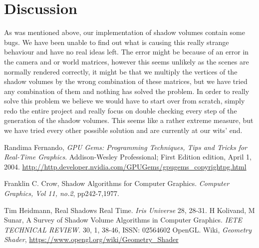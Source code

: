 \documentclass[a4paper, 12pt]{article}
\begin{document}
\section{Discussion}
As was mentioned above, our implementation of shadow volumes contain some bugs. We have been unable to find out what is causing this really strange behaviour and have no real ideas left. The error might be because of an error in the camera and or world matrices, however this seems unlikely as the scenes are normally rendered correctly, it might be that we multiply the vertices of the shadow volumes by the wrong combination of these matrices, but we have tried any combination of them and nothing has solved the problem. In order to really solve this problem we believe we would have to start over from scratch, simply redo the entire project and really focus on double checking every step of the generation of the shadow volumes. This seems like a rather extreme measure, but
we have tried every other possible solution and are currently at our wits' end.

\begin{thebibliography}{9}
	Randima Fernando,
	\emph{GPU Gems: Programming Techniques, Tips and Tricks for Real-Time
	Graphics}.
	Addison-Wesley Professional; First Edition edition, April 1, 2004.
	\url{http://http.developer.nvidia.com/GPUGems/gpugems\_copyrightpg.html}

  Franklin C. Crow,
  Shadow Algorithms for Computer Graphics.
  \emph{Computer Graphics, Vol 11, no.2}, pp242-7,1977.

  Tim Heidmann,
  Real Shadows Real Time.
  \emph{Iris Universe} 28, 28-31.
   H Kolivand, M Sunar,
   A Survey of Shadow Volume Algorithms in Computer Graphics.
   \emph{IETE TECHNICAL REVIEW.} 30, 1, 38-46, ISSN: 02564602
  OpenGL. Wiki,
  \emph{Geometry Shader},
  \url{https://www.opengl.org/wiki/Geometry_Shader}
\end{thebibliography}
\end{document}
